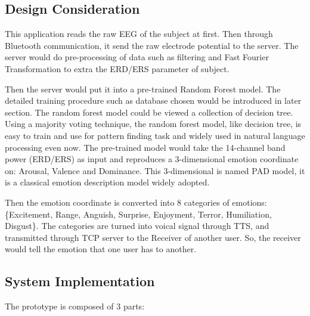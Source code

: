 \documentclass[a4paper]{article}
\begin{document}
\subsection{Design Consideration}

This application reads the raw EEG of the subject at first. Then through Bluetooth communication, it send the raw electrode potential to the server. The server would do pre-processing of data such as filtering and Fast Fourier Transformation to extra the ERD/ERS parameter of subject.

Then the server would put it into a pre-trained Random Forest model. The detailed training procedure such as database chosen would be introduced in later section. The random forest model could be viewed a collection of decision tree. Using a majority voting technique, the random forest model, like decision tree, is easy to train and use for pattern finding task and widely used in natural language processing even now. The pre-trained model would take the 14-channel band power (ERD/ERS) as input and reproduces a 3-dimensional emotion coordinate on: Arousal, Valence and Dominance. This 3-dimensional is named PAD model, it is a classical emotion description model widely adopted.\autocite{bakker2014pleasure}

Then the emotion coordinate is converted into 8 categories of emotions: \{Excitement, Range, Anguish, Surprise, Enjoyment, Terror, Humiliation, Disgust\}. The categories are turned into voical signal through TTS, and transmitted through TCP server to the Receiver of another user. So, the receiver would tell the emotion that one user has to another.

\subsection{System Implementation}

The prototype is composed of 3 parts:
\end{document}
